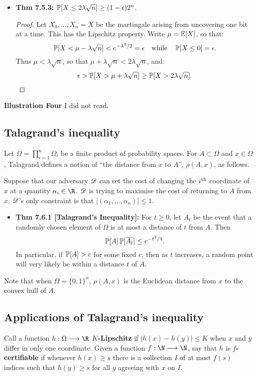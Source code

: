\documentclass[11pt]{article}
\newenvironment{INT}[1][]{\begin{itemize}\small\item\textbf{#1}}{\end{itemize}}
\begin{document}
\begin{chapter7}
\begin{itemise}
\begin{INT}[Thm 7.5.3:]
$\operatorname{\mathbb{P}}[X\leq{2\lambda\sqrt n}]\geq(1-\epsilon)2^{n}$.
\begin{proof}
Let $X_0,\ldots,X_n=X$ be the martingale arising from uncovering one bit at a time.  This has the Lipschitz property. Write $\mu=\operatorname{\mathbb{E}}[X]$, so that: 
\[\operatorname{\mathbb{P}}[X<\mu-\lambda\sqrt n]<e^{-\lambda^2/2}=\epsilon\textup{\quad while\quad }\operatorname{\mathbb{P}}[X\leq0]=\epsilon.\]
Thus $\mu<\lambda\sqrt n$, so that $\mu+\lambda\sqrt n<2\lambda\sqrt n$, and:
\[\epsilon>\operatorname{\mathbb{P}}[X>\mu+\lambda\sqrt n]\geq\operatorname{\mathbb{P}}[X>2\lambda\sqrt n].\qedhere\]
\end{proof}
\end{INT}
\item \textbf{Illustration Four} I did not read.
\end{itemise}
\subsection*{Talagrand's inequality}
Let $\Omega=\prod_{i=1}^n\Omega_i$ be a finite product of probability spaces. For $A\subset\Omega$ and $x\in \Omega$, Talagrand defines a notion of ``the distance from $x$ to $A$'', $\rho(A,x)$, as follows.

\INDENT Suppose that our adversary $\mathscr{D}$ can set the cost of changing the $i^\textup{th}$ coordinate of $x$ at a quantity $\alpha_i\in\R$. $\mathscr{D}$ is trying to maximise the cost of returning to $A$ from $x$. $\mathscr{D}$'s only constraint is that $|(\alpha_1,\ldots,\alpha_n)|\leq1$.
\begin{INT}[Thm 7.6.1 {[Talagrand's Inequality]}:] For $t\geq0$, let $A_t$ be the event that a randomly chosen element of $\Omega$ is at most a distance of $t$ from $A$. Then
\[\operatorname{\mathbb{P}}[A]\operatorname{\mathbb{P}}[\overline{A_t}]\leq e^{-t^2/4}.\]
In particular, if $\operatorname{\mathbb{P}}[A]>c$ for some fixed $c$, then as $t$ increases, a random point will very likely be within a distance $t$ of $A$.
\end{INT}
Note that when $\Omega=\{0,1\}^n$, $\rho(A,x)$ is the Euclidean distance from $x$ to the convex hull of $A$.
\subsection*{Applications of Talagrand's inequality}
Call a function $h:\Omega\to\R$ \textbf{$K$-Lipschitz} if $|h(x)-h(y)|\leq K$ when $x$ and $y$ differ in only one coordinate. Given a function $f:\N\to\N$, say that $h$ is \textbf{$f$-certifiable} if whenever $h(x)\geq s$ there is a collection $I$ of at most $f(s)$ indices such that $h(y)\geq s$ for all $y$ agreeing with $x$ on $I$.
\end{chapter7}
\end{document}
